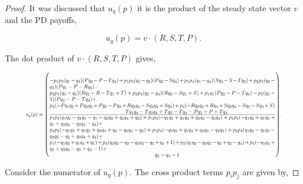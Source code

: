 \begin{proof}

It was discussed that \(u_q(p)\) it is the product of the steady state
vector \(v\) and the PD payoffs,

\[u_q(p) = v \cdot (R, S, T, P).\]

The dot product of \(v \cdot (R, S, T, P)\) gives,

\begingroup
\scriptsize
\begin{equation*}
    \resizebox{0.91\hsize}{!}{
    $u_q(p) = \left(
    \frac
        {\parbox{6in}{$ - p_{1} p_{2} (q_{1} - q_{3}) (P q_{2} - P - T q_{4}) + p_{1} p_{3} (q_{1} - q_{2}) (P q_{3} - S q_{4}) + p_{1} p_{4} (q_{1} - q_{4}) (S q_{2} - S - T q_{3}) + p_{2} p_{3} (q_{2} - q_{3}) (P q_{1} - P - R q_{4}) - $ \\
        $ p_{2} p_{4} (q_{3} - q_{4}) (R q_{2} - R - T q_{1} + T) + p_{3} p_{4} (q_{2} - q_{4}) (R q_{3} - S q_{1} + S) + p_{1} q_{1} (P q_{2} - P - T q_{4}) - p_{2} (q_{3} - 1) (P q_{2} - P - T q_{4}) + $ \\
        $ p_{3} (- P q_{1} q_{2} + P q_{2} q_{3} + P q_{2} - P q_{3} + R q_{2} q_{4} - S q_{2} q_{4} + S q_{4}) + p_{4} (- R q_{2} q_{4} + R q_{4} + S q_{2} q_{4} - S q_{2} - S q_{4} + S ) $ \\
        \hspace*{5cm} $ T q_{1} q_{4} - T q_{3} q_{4} + T q_{3} - T q_{4} - P q_{2} + P + T q_{4}$
        }}
        {\parbox{6in}{$
        p_{1} p_{2} (q_{1} q_{2} - q_{1} q_{4} - q_{1} - q_{2} q_{3} + q_{3} q_{4} + q_{3}) + p_{1} p_{3} (- q_{1} q_{3} + q_{1} q_{4} + q_{2} q_{3} - q_{2} q_{4}) + p_{1} p_{4} (- q_{1} q_{2} + q_{1} q_{3} + q_{1} + q_{2} q_{4} - q_{3} q_{4} - q_{4}) +$ \\
        $ p_{2} p_{3} (- q_{1} q_{2} + q_{1} q_{3} + q_{2} q_{4} + q_{2} - q_{3} q_{4} - q_{3}) + p_{2} p_{4} (- q_{1} q_{3} + q_{1} q_{4} + q_{2} q_{3} - q_{2} q_{4}) + p_{3} p_{4} (q_{1} q_{2} - q_{1} q_{4} - q_{2} q_{3} - q_{2} + q_{3} q_{4} + q_{4}) + $ \\
        $ p_{1} (- q_{1} q_{2} + q_{1} q_{4} + q_{1}) + p_{2} (q_{2} q_{3} - q_{2} - q_{3} q_{4} - q_{3} + q_{4} + 1) + p_{3} (q_{1} q_{2} - q_{2} q_{3} - q_{2} + q_{3} - q_{4}) + p_{4} (- q_{1} q_{4} + q_{2} + q_{3} q_{4} - q_{3} + q_{4} - 1) + $ \\
        \hspace*{7cm} $q_{2} - q_{4} - 1$
    }}
    \right).$}
\end{equation*}
    \endgroup

Consider the numerator of \(u_q(p)\). The cross product terms \(p_ip_j\) are
given by,


\end{proof}
